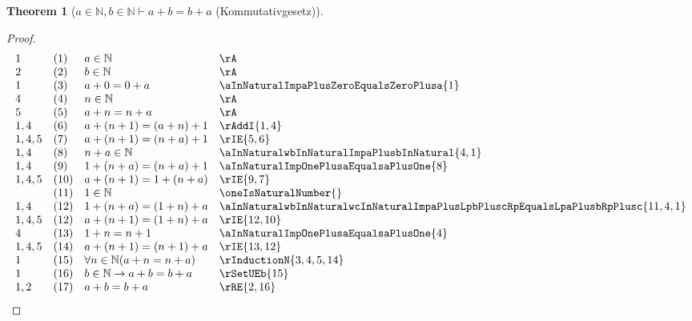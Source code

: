 \documentclass{book}
\theoremstyle{plain}
\newtheorem{theorem}{Theorem}
\theoremstyle{remark}
\theoremstyle{definition}
\begin{document}
\label{aInNaturalwbInNaturalImpaPlusbEqualsbPlusa}
\begin{theorem}[\(a\in\mathbb{N}, b\in\mathbb{N}\vdash a+b=b+a\) (Kommutativgesetz)]
\end{theorem}
\begin{proof}
        \[
	\begin{array}{llll}
            1       &  (1) & a\in\mathbb{N} & \rA \\
            2       &  (2) & b\in\mathbb{N} & \rA \\
            1       &  (3) & a+0=0+a & \aInNaturalImpaPlusZeroEqualsZeroPlusa{1} \\
            4       &  (4) & n\in\mathbb{N} & \rA \\
            5       &  (5) & a+n=n+a & \rA \\
            1,4     &  (6) & a+(n+1)=(a+n)+1 & \rAddI{1,4} \\
            1,4,5   &  (7) & a+(n+1)=(n+a)+1 & \rIE{5,6} \\
            1,4     &  (8) & n+a\in\mathbb{N} & \aInNaturalwbInNaturalImpaPlusbInNatural{4,1} \\
            1,4     &  (9) & 1+(n+a)=(n+a)+1 & \aInNaturalImpOnePlusaEqualsaPlusOne{8} \\
            1,4,5   &  (10) & a+(n+1)=1+(n+a) & \rIE{9,7} \\
                    &  (11) & 1\in\mathbb{N} & \oneIsNaturalNumber{} \\
            1,4     &  (12) & 1+(n+a)=(1+n)+a & \aInNaturalwbInNaturalwcInNaturalImpaPlusLpbPluscRpEqualsLpaPlusbRpPlusc{11,4,1} \\
            1,4,5   &  (12) & a+(n+1)=(1+n)+a & \rIE{12,10} \\
            4       &  (13) & 1+n=n+1 & \aInNaturalImpOnePlusaEqualsaPlusOne{4} \\
            1,4,5   &  (14) & a+(n+1)=(n+1)+a & \rIE{13,12} \\
            1       &  (15) & \forall n\in\mathbb{N}(a+n=n+a) & \rInductionN{3,4,5,14} \\
            1       &  (16) & b\in\mathbb{N}\rightarrow a+b=b+a & \rSetUEb{15} \\
            1,2     &  (17) & a+b=b+a & \rRE{2,16} \\
	\end{array}
	\]
\end{proof}
\end{document}
